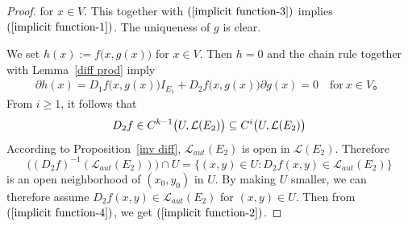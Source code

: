 \begin{proof}
for $x\in V$. This together with $(\ref{implicit function-3})$ implies $(\ref{implicit function-1})$. The uniqueness of $g$ is clear.\par
We set $h(x):=f\big(x, g(x)\big)$ for $x\in V$. Then $h=0$ and the chain rule together with Lemma~\ref{diff prod} imply
\begin{align}\label{implicit function-4}
\partial h(x)=D_1f\big(x,g(x)\big)I_{E_1}+D_2f\big(x,g(x)\big)\partial g(x)=0\quad\text{for}\ x\in V。
\end{align}
From $i\geq1$, it follows that 
\[D_2f\in C^{k-1}\big(U,\mathcal{L}(E_2)\big)\subseteq C^i\big(U,\mathcal{L}(E_2)\big)\]
According to Proposition~\ref{inv diff}, $\mathcal{L}_{aut}(E_2)$ is open in $\mathcal{L}(E_2)$. Therefore
\[\big((D_2f)^{-1}(\mathcal{L}_{aut}(E_2))\big)\cap U=\{(x,y)\in U:D_2f(x,y)\in\mathcal{L}_{aut}(E_2)\}\]
is an open neighborhood of $(x_0,y_0)$ in $U$. By making $U$ smaller, we can therefore assume $D_2f(x,y)\in\mathcal{L}_{aut}(E_2)$ for $(x,y)\in U$. Then from $(\ref{implicit function-4})$, we get $(\ref{implicit function-2})$.
\end{proof}
